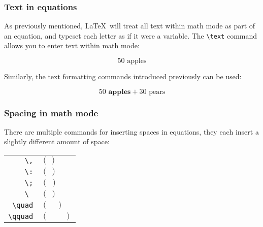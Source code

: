 \documentclass[mathserif]{beamer}
\begin{document}
\begin{frame}[fragile]
\frametitle{Text in equations}
\vfill
As previously mentioned, \LaTeX\ will treat all text within math mode as part of an equation, and typeset each letter as if it were a variable. The \texttt{\textbackslash{text}} command allows you to enter text within math mode:
\vfill
	\begin{LTXexample}[style=latexsty]
		\[ 50 \text{ apples}  \]
	\end{LTXexample}
\vfill
Similarly, the text formatting commands introduced previously can be used:
\vfill
	\begin{LTXexample}[style=latexsty]
		\[ 50 \textbf{ apples} + 30 \textrm{ pears} \]
	\end{LTXexample}
\vfill
\end{frame}

\begin{frame}[fragile]
\frametitle{Spacing in math mode}
\vfill
There are multiple commands for inserting spaces in equations, they each insert a slightly different amount of space:
\vfill
\begin{center}
\begin{tabular}{r | l | }
	\texttt{{\textbackslash},} & $(\,)$ \\
	\texttt{{\textbackslash}:} & $(\:)$ \\
	\texttt{{\textbackslash};} & $(\;)$ \\
	\texttt{{\textbackslash} } & $(\ )$ \\
	\texttt{{\textbackslash}quad} & $(\quad)$ \\
	\texttt{{\textbackslash}qquad} & $(\qquad)$ \\
\end{tabular}
\end{center}
\vfill
\end{frame}
\end{document}
